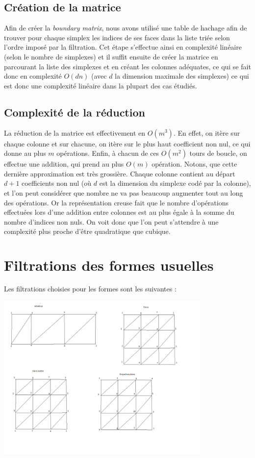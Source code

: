 \documentclass[french, a4paper, 12pt]{article}
\begin{document}
\subsection{Création de la matrice}

Afin de créer la \textit{boundary matrix}, nous avons utilisé une
table de hachage afin de trouver pour chaque simplex les indices
de ses faces dans la liste triée selon l'ordre imposé par la
filtration. Cet étape s'effectue ainsi en complexité linéaire 
(selon le nombre de simplexes) et il suffit 
ensuite de créer la matrice en parcourant la liste des simplexes 
et en créant les colonnes adéquates, ce qui se fait donc en 
complexité $O(dn)$ (avec $d$ la dimension maximale des simplexes)
ce qui est donc une complexité linéaire dans la plupart des cas
étudiés.

\subsection{Complexité de la réduction}

La réduction de la matrice est effectivement en $O(m^3 )$. En 
effet, on itère sur chaque colonne et sur chacune, on itère sur le 
plus haut coefficient non nul, ce qui donne au plus $m$ opérations. 
Enfin, à chacun de ces $O(m^2 )$ tours de boucle, on effectue une 
addition, qui prend au plus $O(m)$ opération. Notons, que cette 
dernière approximation est très grossière. Chaque colonne contient 
au départ $d+1$ coefficients non nul (où $d$ est la dimension du 
simplexe codé par la colonne), et l’on peut considérer que nombre
ne va pas beaucoup augmenter tout au long des opérations. Or la 
représentation creuse fait que le nombre d’opérations effectuées 
lors d’une addition entre colonnes est au plus égale à la somme du 
nombre d’indices non nuls. On voit donc que l’on peut s’attendre à 
une complexité plus proche d’être quadratique que cubique.

\pagebreak

\section{Filtrations des formes usuelles}

Les filtrations choisies pour les formes sont les suivantes : 

\includegraphics[width=400px]{filtrations.png}
\end{document}
